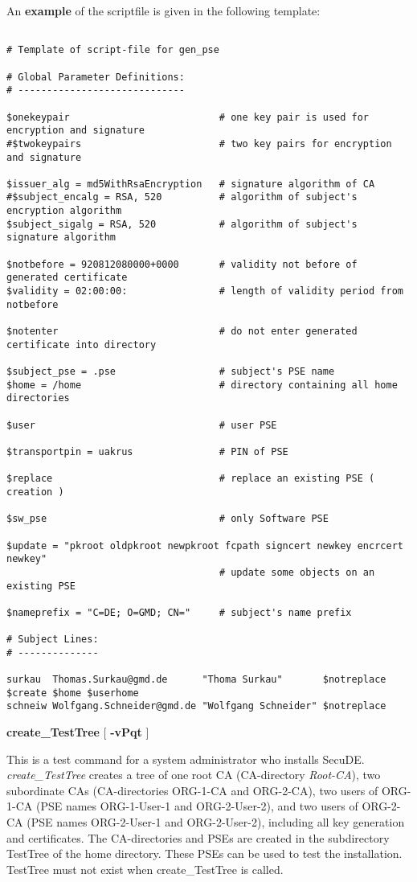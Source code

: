 An {\bf example} of the scriptfile is given in the following template:
{\small
\begin{verbatim}

# Template of script-file for gen_pse

# Global Parameter Definitions:
# -----------------------------

$onekeypair                          # one key pair is used for encryption and signature
#$twokeypairs                        # two key pairs for encryption and signature

$issuer_alg = md5WithRsaEncryption   # signature algorithm of CA
#$subject_encalg = RSA, 520          # algorithm of subject's encryption algorithm
$subject_sigalg = RSA, 520           # algorithm of subject's signature algorithm

$notbefore = 920812080000+0000       # validity not before of generated certificate
$validity = 02:00:00:                # length of validity period from notbefore

$notenter                            # do not enter generated certificate into directory

$subject_pse = .pse                  # subject's PSE name
$home = /home                        # directory containing all home directories

$user                                # user PSE

$transportpin = uakrus               # PIN of PSE

$replace                             # replace an existing PSE ( creation )

$sw_pse                              # only Software PSE

$update = "pkroot oldpkroot newpkroot fcpath signcert newkey encrcert newkey"
                                     # update some objects on an existing PSE

$nameprefix = "C=DE; O=GMD; CN="     # subject's name prefix

# Subject Lines:
# --------------

surkau  Thomas.Surkau@gmd.de      "Thoma Surkau"       $notreplace $create $home $userhome
schneiw Wolfgang.Schneider@gmd.de "Wolfgang Schneider" $notreplace
\end{verbatim}
}
\vspace{1em}
{\bf create\_TestTree} [ {\bf -vPqt} ] 

This is a test command for a system administrator who installs SecuDE. {\em create\_TestTree}
creates a tree of one root CA (CA-directory {\em Root-CA}), two subordinate CAs (CA-directories
ORG-1-CA and ORG-2-CA), two users of ORG-1-CA (PSE names ORG-1-User-1 and ORG-2-User-2),
and two users of ORG-2-CA (PSE names ORG-2-User-1 and ORG-2-User-2), including all key generation
and certificates. The CA-directories and PSEs are created in the subdirectory TestTree of the 
home directory. 
These PSEs can be used to test the installation. TestTree must not exist when
create\_TestTree is called.

